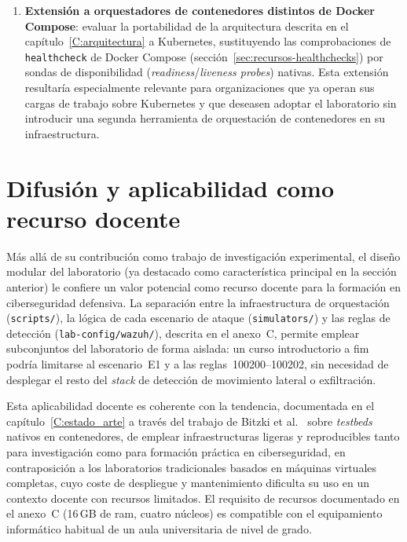 \documentclass[../main.tex]{subfiles}
\begin{document}
\begin{enumerate}[label=TF\arabic*., leftmargin=2.5cm]
  \item \textbf{Extensión a orquestadores de contenedores distintos de Docker
  Compose}: evaluar la portabilidad de la arquitectura descrita en el
  capítulo~\ref{C:arquitectura} a Kubernetes, sustituyendo las comprobaciones
  de \texttt{healthcheck} de Docker Compose (sección~\ref{sec:recursos-healthchecks})
  por sondas de disponibilidad (\emph{readiness}/\emph{liveness probes})
  nativas. Esta extensión resultaría especialmente relevante para organizaciones
  que ya operan sus cargas de trabajo sobre Kubernetes y que deseasen adoptar
  el laboratorio sin introducir una segunda herramienta de orquestación de
  contenedores en su infraestructura.

\end{enumerate}

\section{Difusión y aplicabilidad como recurso docente}
\label{sec:difusion}

Más allá de su contribución como trabajo de investigación experimental, el
diseño modular del laboratorio (ya destacado como característica principal
en la sección anterior) le confiere un valor potencial como recurso docente
para la formación en ciberseguridad defensiva. La separación entre la
infraestructura de orquestación (\texttt{scripts/}), la lógica de cada
escenario de ataque (\texttt{simulators/}) y las reglas de detección
(\texttt{lab-config/wazuh/}), descrita en el anexo~C, permite emplear
subconjuntos del laboratorio de forma aislada: un curso introductorio a
\gls{fim} podría limitarse al escenario~E1 y a las reglas~100200--100202, sin
necesidad de desplegar el resto del \emph{stack} de detección de movimiento
lateral o exfiltración.

Esta aplicabilidad docente es coherente con la tendencia, documentada en el
capítulo~\ref{C:estado_arte} a través del trabajo de Bitzki et
al.~\cite{netsecbed2026} sobre \emph{testbeds} nativos en contenedores, de
emplear infraestructuras ligeras y reproducibles tanto para investigación como
para formación práctica en ciberseguridad, en contraposición a los laboratorios
tradicionales basados en máquinas virtuales completas, cuyo coste de
despliegue y mantenimiento dificulta su uso en un contexto docente con
recursos limitados. El requisito de recursos documentado en el anexo~C
(16\,GB de \gls{ram}, cuatro núcleos) es compatible con el equipamiento
informático habitual de un aula universitaria de nivel de grado.
\end{document}
